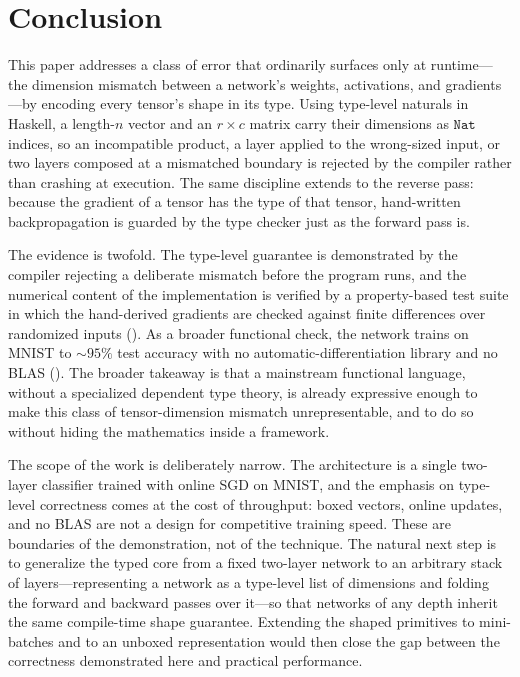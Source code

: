 \documentclass[sigconf,nonacm]{acmart}
\begin{document}
\section{Conclusion}
\label{sec:conclusion}

This paper addresses a class of error that ordinarily surfaces only at
runtime---the dimension mismatch between a network's weights, activations, and
gradients---by encoding every tensor's shape in its type. Using type-level
naturals in Haskell, a length-$n$ vector and an $r\times c$ matrix carry their
dimensions as $\mathtt{Nat}$ indices, so an incompatible product, a layer applied
to the wrong-sized input, or two layers composed at a mismatched boundary is
rejected by the compiler rather than crashing at execution. The same discipline
extends to the reverse pass: because the gradient of a tensor has the type of
that tensor, hand-written backpropagation is guarded by the type checker just as
the forward pass is.

The evidence is twofold. The type-level guarantee is demonstrated by the compiler
rejecting a deliberate mismatch before the program runs, and the numerical
content of the implementation is verified by a property-based test suite in which
the hand-derived gradients are checked against finite differences over randomized
inputs (). As a broader functional check, the network
trains on MNIST to ${\sim}95\%$ test accuracy with no
automatic-differentiation library and no BLAS (). The broader
takeaway is that a mainstream functional language, without a specialized
dependent type theory, is already expressive enough to make this class of
tensor-dimension mismatch unrepresentable, and to do so without hiding the
mathematics inside a framework.

The scope of the work is deliberately narrow. The architecture is a single
two-layer classifier trained with online SGD on MNIST, and the
emphasis on type-level correctness comes at the cost of throughput: boxed
vectors, online updates, and no BLAS are not a design for competitive training
speed. These are boundaries of the demonstration, not of the technique. The
natural next step is
to generalize the typed core from a fixed two-layer network to an arbitrary stack
of layers---representing a network as a type-level list of dimensions and folding
the forward and backward passes over it---so that networks of any depth inherit
the same compile-time shape guarantee. Extending the shaped primitives to
mini-batches and to an unboxed representation would then close the gap between
the correctness demonstrated here and practical performance.



\end{document}
